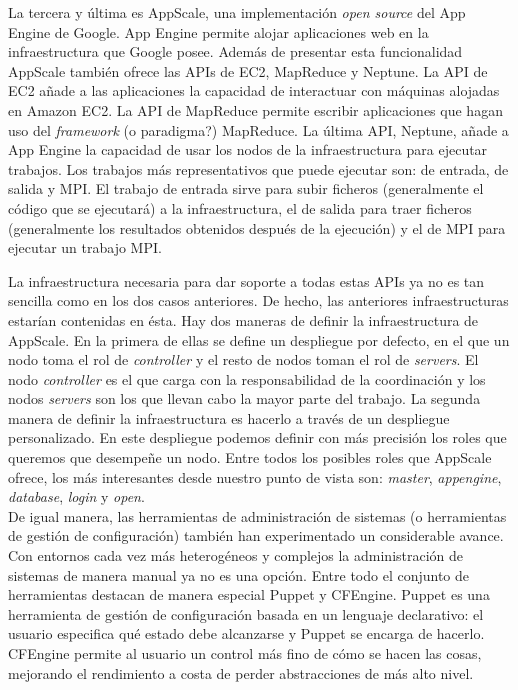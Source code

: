 La tercera y última es AppScale, una implementación \emph{open source} del App Engine de Google. App Engine permite alojar aplicaciones web en la infraestructura que Google posee. Además de presentar esta funcionalidad AppScale también ofrece las APIs de EC2, MapReduce y Neptune. La API de EC2 añade a las aplicaciones la capacidad de interactuar con máquinas alojadas en Amazon EC2. La API de MapReduce permite escribir aplicaciones que hagan uso del \emph{framework} (o paradigma?) MapReduce. La última API, Neptune, añade a App Engine la capacidad de usar los nodos de la infraestructura para ejecutar trabajos. Los trabajos más representativos que puede ejecutar son: de entrada, de salida y MPI. El trabajo de entrada sirve para subir ficheros (generalmente el código que se ejecutará) a la infraestructura, el de salida para traer ficheros (generalmente los resultados obtenidos después de la ejecución) y el de MPI para ejecutar un trabajo MPI.

La infraestructura necesaria para dar soporte a todas estas APIs ya no es tan sencilla como en los dos casos anteriores. De hecho, las anteriores infraestructuras estarían contenidas en ésta. Hay dos maneras de definir la infraestructura de AppScale. En la primera de ellas se define un despliegue por defecto, en el que un nodo toma el rol de \emph{controller} y el resto de nodos toman el rol de \emph{servers}. El nodo \emph{controller} es el que carga con la responsabilidad de la coordinación y los nodos \emph{servers} son los que llevan cabo la mayor parte del trabajo. La segunda manera de definir la infraestructura es hacerlo a través de un despliegue personalizado. En este despliegue podemos definir con más precisión los roles que queremos que desempeñe un nodo. Entre todos los posibles roles que AppScale ofrece, los más interesantes desde nuestro punto de vista son: \emph{master}, \emph{appengine}, \emph{database}, \emph{login} y \emph{open}.\\

De igual manera, las herramientas de administración de sistemas (o herramientas de gestión de configuración) también han experimentado un considerable avance. Con entornos cada vez más heterogéneos y complejos la administración de sistemas de manera manual ya no es una opción. Entre todo el conjunto de  herramientas destacan de manera especial Puppet y CFEngine. Puppet es una herramienta de gestión de configuración basada en un lenguaje  declarativo: el usuario especifica qué estado debe alcanzarse y Puppet se encarga de hacerlo. CFEngine permite al usuario un control más fino de cómo se hacen las cosas, mejorando el rendimiento a costa de perder abstracciones de más alto nivel.\\

